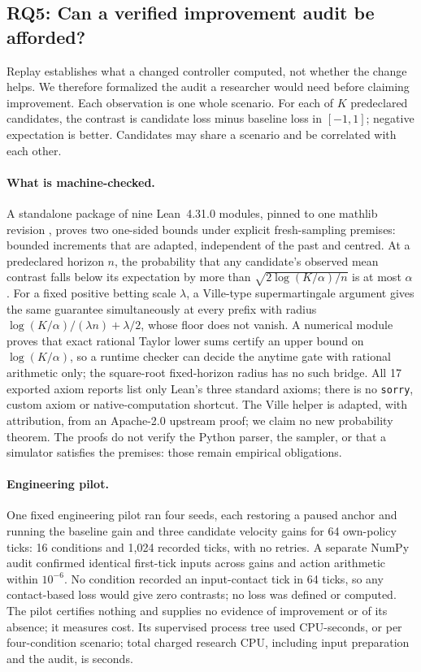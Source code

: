 \documentclass[10pt]{article}
\begin{document}
\subsection{RQ5: Can a verified improvement audit be afforded?}
\label{sec:rq5}
Replay establishes what a changed controller computed, not whether the change
helps. We therefore formalized the audit a researcher would need before claiming
improvement. Each observation is one whole scenario. For each of $K$
predeclared candidates, the contrast is candidate loss minus baseline loss in
$[-1,1]$; negative expectation is better. Candidates may share a scenario and
be correlated with each other.

\paragraph{What is machine-checked.}
A standalone package of nine Lean~4.31.0 modules, pinned to one mathlib revision
\citep{demoura2021lean4,mathlib2020}, proves two one-sided bounds under explicit
fresh-sampling premises: bounded increments that are adapted, independent of the
past and centred. At a predeclared horizon $n$, the probability that any
candidate's observed mean contrast falls below its expectation by more than
$\sqrt{2\log(K/\alpha)/n}$ is at most $\alpha$ \citep{hoeffding1963probability}.
For a fixed positive betting scale $\lambda$, a Ville-type supermartingale
argument \citep{ville1939etude,howard2021timeuniform} gives the same guarantee
simultaneously at every prefix with radius
$\log(K/\alpha)/(\lambda n)+\lambda/2$, whose floor does not vanish. A
numerical module proves that exact rational Taylor lower sums certify an upper
bound on $\log(K/\alpha)$, so a runtime checker can decide the anytime gate with
rational arithmetic only; the square-root fixed-horizon radius has no such
bridge. All 17 exported axiom reports list only Lean's three standard
axioms; there is no \texttt{sorry}, custom axiom or native-computation shortcut.
The Ville helper is adapted, with attribution, from an Apache-2.0 upstream proof;
we claim no new probability theorem. The proofs do not verify the Python parser,
the sampler, or that a simulator satisfies the premises: those remain empirical
obligations.

\paragraph{Engineering pilot.}
One fixed engineering pilot ran four seeds, each restoring a paused anchor and
running the baseline gain and three candidate velocity gains for 64 own-policy
ticks: 16 conditions and 1,024 recorded ticks, with no retries. A separate
NumPy audit confirmed identical first-tick inputs across gains and action
arithmetic within $10^{-6}$. No condition recorded an input-contact tick in 64 ticks, so any contact-based
loss would give zero contrasts; no loss was defined or computed. The pilot
certifies nothing and supplies no
evidence of improvement or of its absence; it measures cost. Its supervised
process tree used \AuditPilotCpu{} CPU-seconds, or \AuditPerScenarioCpu{} per
four-condition scenario; total charged research CPU, including input preparation
and the audit, is \AuditChargedCpu{} seconds.
\end{document}
